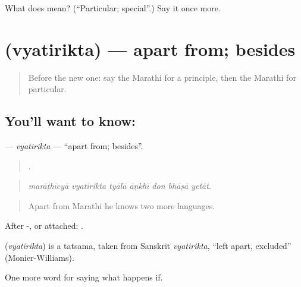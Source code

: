 \begin{tcolorbox}[breakable,colback=teal!4,colframe=teal!35!black,title={Before you move on}]
What does  mean? (\textquotedblleft{}Particular; special\textquotedblright{}.) Say it once more.
\end{tcolorbox}
\section[\texorpdfstring{\mr{व्यतिरिक्त} (vyatirikta)}{व्यतिरिक्त (vyatirikta)}]{ (vyatirikta) — apart from; besides}

\label{lesson:MR-C390-vyatirikta}



\begin{quote}
Before the new one: say the Marathi for a principle, then the Marathi for particular.
\end{quote}

\subsection*{You'll want to know: }
\textbf{} — \emph{vyatirikta} — \textquotedblleft{}apart from; besides\textquotedblright{}.

\begin{quote}
      .
\end{quote}

\begin{quote}
\emph{marāṭhīcyā vyatirikta tyālā āṇkhī don bhāṣā yetāt.}
\end{quote}

\begin{quote}
Apart from Marathi he knows two more languages.
\end{quote}

After -, or attached: .

\begin{cousinweb}
\textbf{} (\emph{vyatirikta}) is a tatsama, taken from Sanskrit \emph{vyatirikta}, \textquotedblleft{}left apart, excluded\textquotedblright{} (Monier-Williams).
\end{cousinweb}

\begin{grammarlens}[title={What you've built}]
One more word for saying what happens if.
\end{grammarlens}

